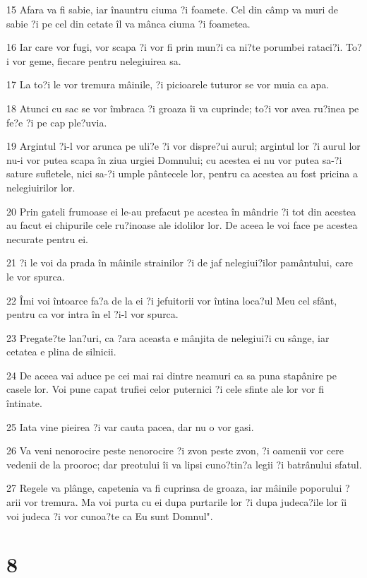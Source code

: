 \par 15 Afara va fi sabie, iar înauntru ciuma ?i foamete. Cel din câmp va muri de sabie ?i pe cel din cetate îl va mânca ciuma ?i foametea.
\par 16 Iar care vor fugi, vor scapa ?i vor fi prin mun?i ca ni?te porumbei rataci?i. To?i vor geme, fiecare pentru nelegiuirea sa.
\par 17 La to?i le vor tremura mâinile, ?i picioarele tuturor se vor muia ca apa.
\par 18 Atunci cu sac se vor îmbraca ?i groaza îi va cuprinde; to?i vor avea ru?inea pe fe?e ?i pe cap ple?uvia.
\par 19 Argintul ?i-l vor arunca pe uli?e ?i vor dispre?ui aurul; argintul lor ?i aurul lor nu-i vor putea scapa în ziua urgiei Domnului; cu acestea ei nu vor putea sa-?i sature sufletele, nici sa-?i umple pântecele lor, pentru ca acestea au fost pricina a nelegiuirilor lor.
\par 20 Prin gateli frumoase ei le-au prefacut pe acestea în mândrie ?i tot din acestea au facut ei chipurile cele ru?inoase ale idolilor lor. De aceea le voi face pe acestea necurate pentru ei.
\par 21 ?i le voi da prada în mâinile strainilor ?i de jaf nelegiui?ilor pamântului, care le vor spurca.
\par 22 Îmi voi întoarce fa?a de la ei ?i jefuitorii vor întina loca?ul Meu cel sfânt, pentru ca vor intra în el ?i-l vor spurca.
\par 23 Pregate?te lan?uri, ca ?ara aceasta e mânjita de nelegiui?i cu sânge, iar cetatea e plina de silnicii.
\par 24 De aceea vai aduce pe cei mai rai dintre neamuri ca sa puna stapânire pe casele lor. Voi pune capat trufiei celor puternici ?i cele sfinte ale lor vor fi întinate.
\par 25 Iata vine pieirea ?i var cauta pacea, dar nu o vor gasi.
\par 26 Va veni nenorocire peste nenorocire ?i zvon peste zvon, ?i oamenii vor cere vedenii de la prooroc; dar preotului îi va lipsi cuno?tin?a legii ?i batrânului sfatul.
\par 27 Regele va plânge, capetenia va fi cuprinsa de groaza, iar mâinile poporului ?arii vor tremura. Ma voi purta cu ei dupa purtarile lor ?i dupa judeca?ile lor îi voi judeca ?i vor cunoa?te ca Eu sunt Domnul".

\chapter{8}

